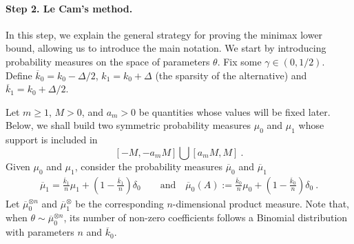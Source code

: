 \documentclass[twoside,11pt]{article}
\def\beq{\begin{equation}}
\def\eeq{\end{equation}}
\newcommand{\<}{\langle}
\renewcommand{\>}{\rangle}
\begin{document}
\paragraph{Step 2. Le Cam's method.}





In this step, we explain the general strategy for proving the minimax lower bound, allowing us to introduce the main notation. 
We start by introducing probability measures on the space of parameters $\theta$. 
Fix some $\gamma\in (0,1/2)$.  Define $\overline{k}_0=k_0-\Delta/2$, $k_1=k_0+\Delta$ (the sparsity of the alternative) and  $\overline{k}_1=k_0+\Delta/2$. 

Let $m\geq 1$, $M > 0$, and $a_m>0$ be quantities whose values will be fixed later. Below, we shall build two symmetric probability measures $\mu_0$ and $\mu_1$ whose support is included in
 \beq\label{eq:support_mu}
 [-M,-a_{m}M] \bigcup [a_{m}M, M]\ .
 \eeq
Given $\mu_0$ and $\mu_1$, consider the probability measures $\overline{\mu}_0$ and $\overline{\mu}_1$ 
\begin{align*}
\overline{\mu}_1 = \frac{ \overline{k}_1}{ n}\mu_1 + (1 - \frac{ \overline{k}_1}{ n}) \delta_0  \quad \quad \mathrm{and}\quad 
\overline{\mu}_0(A):= \frac{ \overline{k}_0}{ n}\mu_0 +   (1 - \frac{ \overline{k}_0}{ n}) \delta_0\ .
\end{align*}
Let $\overline{\mu}_0^{\otimes n}$ and  $\overline{\mu}_1^{\otimes}$ be the corresponding $n$-dimensional product measure. Note that, when $\theta\sim \overline{\mu}_0^{\otimes n}$, its number of non-zero coefficients follows a Binomial distribution with parameters $n$ and $\overline{k}_0$.
\end{document}
